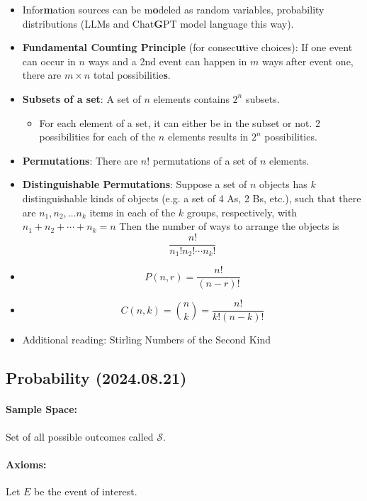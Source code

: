 \documentclass[12pt]{article}
\begin{document}
\begin{itemize}
\item Infor\textbf{m}ation sources can be m\textbf{o}deled as random variables, probability distributions (LLMs and Chat\textbf{G}PT model language this way).
\item \textbf{Fundamental Counting Principle} (for consec\textbf{u}tive choices): If one event can occur in $n$ ways and a 2nd event can happen in $m$ ways after event one, there are $m \times n$ total possibilitie\textbf{s}.
\item{\textbf{Subsets of a set}: A set of $n$ elements contains $2^n$ subsets.
    \begin{itemize}
        \item For each element of a set, it can either be in the subset or not. 2 possibilities for each of the $n$ elements results in $2^n$ possibilities.
    \end{itemize}
}
\item{\textbf{Permutations}: There are $n!$ permutations of a set of $n$ elements.}
\item{\textbf{Distinguishable Permutations}: Suppose a set of $n$ objects has $k$ distinguishable kinds of objects (e.g. a set of 4 As, 2 Bs, etc.), such that there are $n_1, n_2,\dots n_k$ items in each of the $k$ groups, respectively, with $n_1+n_2+\cdots+n_k=n$ Then the number of ways to arrange the objects is 
\[\frac{n!}{n_1!n_2!\cdots n_k!}\]}

\item \[P(n, r) = \frac{n!}{(n-r)!}\]
\item{\[C(n,k) = \binom{n}{k} = \frac{n!}{k! (n-k)!}\]}
\item Additional reading: Stirling Numbers of the Second Kind
\end{itemize}

\newpage
\subsection{Probability (2024.08.21)}

\paragraph{Sample Space:}
Set of all possible outcomes called $\mathcal{S}$.

\paragraph{Axioms:}
Let $E$ be the event of interest. 
\end{document}
